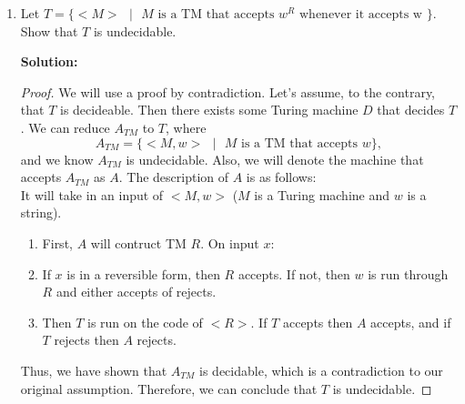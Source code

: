 \documentclass[11pt]{article}
\begin{document}
\begin{enumerate}
\begin{proof}
\end{proof}

\item Let $T = \{<M>\text{ }|\text{ }M\text{ is a TM that accepts }w^R\text{ whenever it accepts w }\}$. Show that $T$
is undecidable.  

\textbf{Solution: }
\begin{proof}

We will use a proof by contradiction.  Let's assume, to the contrary, that $T$ is decideable.  Then there exists some Turing machine $D$ that decides $T$.  We can reduce $A_{TM}$ to $T$, where 
$$ A_{TM} = \{ <M,w>\text{ }|\text{ }M \text{ is a TM that accepts }w \}, $$
and we know $A_{TM}$ is undecidable.  Also, we will denote the machine that accepts $A_{TM}$ as $A$.  The description of $A$ is as follows:\\
It will take in an input of $<M,w>$ ($M$ is a Turing machine and $w$ is a string).  
\begin{enumerate}
\item First, $A$ will contruct TM $R$.  On input $x$: 
\item If $x$ is in a reversible form, then $R$ accepts.  If not, then $w$ is run through $R$ and either accepts of rejects.  
\item Then $T$ is run on the code of $<R>$.  If $T$ accepts then $A$ accepts, and if $T$ rejects then $A$ rejects.  
\end{enumerate}
Thus, we have shown that $A_{TM}$ is decidable, which is a contradiction to our original assumption.  Therefore, we can conclude that $T$ is undecidable.  
\end{proof}


\end{enumerate}
\end{document}
